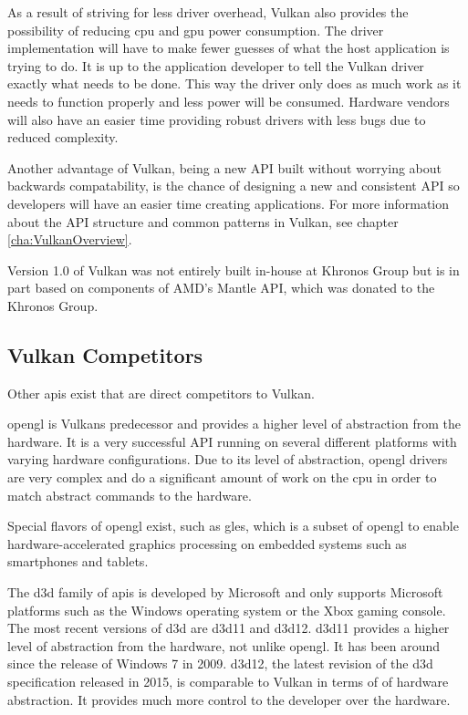     As a result of striving for less driver overhead, Vulkan also provides the possibility of reducing \gls{cpu} and \gls{gpu} power consumption.
    The driver implementation will have to make fewer guesses of what the host application is trying to do.
    It is up to the application developer to tell the Vulkan driver exactly what needs to be done.
    This way the driver only does as much work as it needs to function properly and less power will be consumed.
    Hardware vendors will also have an easier time providing robust drivers with less bugs due to reduced complexity.

    Another advantage of Vulkan, being a new API built without worrying about backwards compatability, is the chance of designing a new and consistent API so developers will have an easier time creating applications.
    For more information about the API structure and common patterns in Vulkan, see chapter \ref{cha:VulkanOverview}.

    Version 1.0 of Vulkan was not entirely built in-house at Khronos Group but is in part based on components of AMD's Mantle API, which was donated to the Khronos Group.


    \subsection{Vulkan Competitors}

      Other \glspl{api} exist that are direct competitors to Vulkan.

      \gls{opengl} is Vulkans predecessor and provides a higher level of abstraction from the hardware.
      It is a very successful API running on several different platforms with varying hardware configurations.
      Due to its level of abstraction, \gls{opengl} drivers are very complex and do a significant amount of work on the \gls{cpu} in order to match abstract commands to the hardware.

      Special flavors of \gls{opengl} exist, such as \gls{gles}, which is a subset of \gls{opengl} to enable hardware-accelerated graphics processing on embedded systems such as smartphones and tablets.

      The \gls{d3d} family of \glspl{api} is developed by Microsoft and only supports Microsoft platforms such as the Windows operating system or the Xbox gaming console.
      The most recent versions of \gls{d3d} are \acrlong{d3d11} and \acrlong{d3d12}.
      \acrlong{d3d11} provides a higher level of abstraction from the hardware, not unlike \gls{opengl}.
      It has been around since the release of Windows 7 in 2009.
      \acrlong{d3d12}, the latest revision of the \gls{d3d} specification released in 2015, is comparable to Vulkan in terms of of hardware abstraction.
      It provides much more control to the developer over the hardware.

